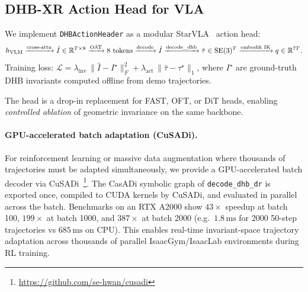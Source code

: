 \subsection{DHB-XR Action Head for VLA}
\label{sec:action_head}

We implement \texttt{DHBActionHeader} as a modular StarVLA~\cite{starvla_2026} action head:
\begin{equation}
h_\text{VLM} \xrightarrow{\text{cross-attn}} \hat I \in \mathbb{R}^{T \times 8}
\xrightarrow{\text{OAT}} \text{8 tokens}
\xrightarrow{\text{decode}} \hat I
\xrightarrow{\text{decode\_dhb}} \hat\tau \in \mathrm{SE}(3)^T
\xrightarrow{\text{embodik IK}} q \in \mathbb{R}^{7T}.
\end{equation}
Training loss: $\mathcal{L} = \lambda_\text{inv}\,\|{\hat I - I^\star}\|^2_F + \lambda_\text{act}\,\|{\hat\tau - \tau^\star}\|_1$,
where $I^\star$ are ground-truth DHB invariants computed offline from demo trajectories.

The head is a drop-in replacement for FAST, OFT, or DiT heads, enabling
\emph{controlled ablation} of geometric invariance on the same backbone.

\paragraph{GPU-accelerated batch adaptation (CuSADi).}
For reinforcement learning or massive data augmentation where thousands
of trajectories must be adapted simultaneously, we provide a
GPU-accelerated batch decoder via
CuSADi~\cite{cusadi2024}\footnote{\url{https://github.com/se-hwan/cusadi}}.
The CasADi symbolic graph of \texttt{decode\_dhb\_dr} is exported once,
compiled to CUDA kernels by CuSADi, and evaluated in parallel across
the batch.
Benchmarks on an RTX A2000 show $43\times$ speedup at batch 100,
$199\times$ at batch 1000, and $387\times$ at batch 2000
(e.g.\ $1.8\,\text{ms}$ for 2000 50-step trajectories vs $685\,\text{ms}$ on CPU).
This enables real-time invariant-space trajectory adaptation across
thousands of parallel IsaacGym/IsaacLab environments during RL training.
